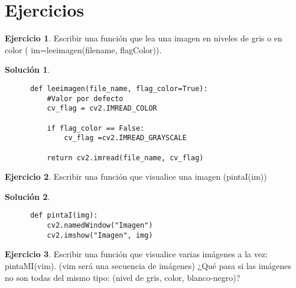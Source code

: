 \documentclass[a4paper, 11pt]{article}
\theoremstyle{definition}
\newtheorem{ejercicio}{Ejercicio}
\newtheorem*{solucion}{Solución}
\begin{document}
  \section{Ejercicios}

  \begin{ejercicio}
      Escribir una función que lea una imagen en niveles de gris o en color ( im=leeimagen(filename, flagColor)).
  \end{ejercicio}

  \begin{solucion}
      \leavevmode
      \begin{lstlisting}
      def leeimagen(file_name, flag_color=True):
          #Valor por defecto
          cv_flag = cv2.IMREAD_COLOR

          if flag_color == False:
              cv_flag =cv2.IMREAD_GRAYSCALE

          return cv2.imread(file_name, cv_flag)
      \end{lstlisting}
  \end{solucion}

  \begin{ejercicio}
      Escribir una función que visualice una imagen (pintaI(im))
  \end{ejercicio}

  \begin{solucion}
      \leavevmode
      \begin{lstlisting}
      def pintaI(img):
          cv2.namedWindow("Imagen")
          cv2.imshow("Imagen", img)
      \end{lstlisting}
  \end{solucion}

  \begin{ejercicio}
      Escribir una función que visualice varias imágenes a la vez: pintaMI(vim). (vim será una secuencia de imágenes) ¿Qué pasa si las imágenes no son todas del mismo tipo: (nivel de gris, color, blanco-negro)?
  \end{ejercicio}
\end{document}
